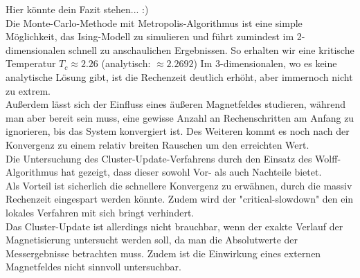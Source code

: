 Hier könnte dein Fazit stehen... :)\\
Die Monte-Carlo-Methode mit Metropolis-Algorithmus ist eine simple Möglichkeit, das Ising-Modell zu simulieren und führt zumindest im 2-dimensionalen schnell zu anschaulichen Ergebnissen. So erhalten wir eine kritische Temperatur $ T_c \approx 2.26 $ (analytisch: $\approx 2.2692$) Im 3-dimensionalen, wo es keine analytische Lösung gibt, ist die Rechenzeit deutlich erhöht, aber immernoch nicht zu extrem.\\
Außerdem lässt sich der Einfluss eines äußeren Magnetfeldes studieren, während man aber bereit sein muss, eine gewisse Anzahl an Rechenschritten am Anfang zu ignorieren, bis das System konvergiert ist. Des Weiteren kommt es noch nach der Konvergenz zu einem relativ breiten Rauschen um den erreichten Wert.\\
Die Untersuchung des Cluster-Update-Verfahrens durch den Einsatz des Wolff-Algorithmus hat gezeigt, dass dieser sowohl Vor- als auch Nachteile bietet.\\
Als Vorteil ist sicherlich die schnellere Konvergenz zu erwähnen, durch die massiv Rechenzeit eingespart werden könnte. Zudem wird der "critical-slowdown" den ein lokales Verfahren mit sich bringt verhindert.\\
Das Cluster-Update ist allerdings nicht brauchbar, wenn der exakte Verlauf der Magnetisierung untersucht werden soll, da man die Absolutwerte der Messergebnisse betrachten muss. Zudem ist die Einwirkung eines externen Magnetfeldes nicht sinnvoll untersuchbar.
 
